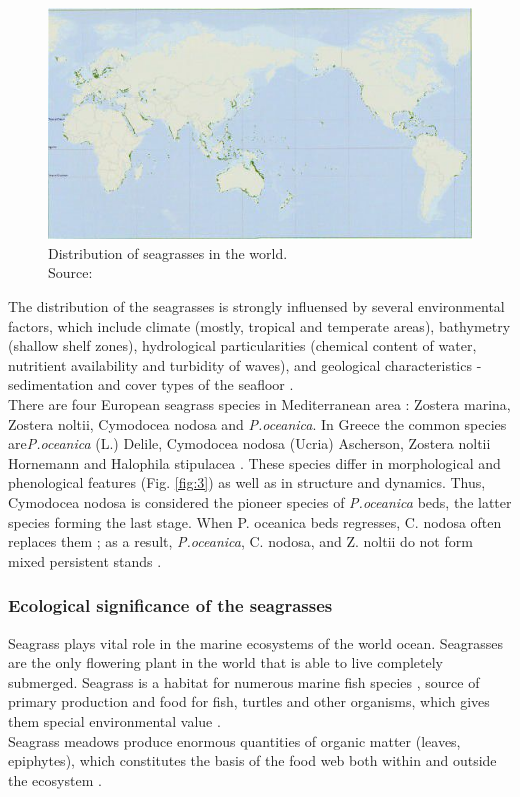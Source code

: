 \documentclass[10pt, a4paper]{article}
\begin{document}
\begin{figure}
	\centering
	\includegraphics[scale=0.25]{Fig-1-2.jpg}
	\caption{Distribution of seagrasses in the world.\\ Source:\cite{Green03}\label{Green03} 
	\label{fig:2}} 
\end{figure}

The distribution of the seagrasses is strongly influensed by several environmental factors, which
include climate (mostly, tropical and temperate areas), bathymetry (shallow shelf zones), hydrological
particularities (chemical content of water, nutritient availability and turbidity of waves), and geological 
characteristics - sedimentation and cover types of the seafloor \cite{McKenzie06}\label{McKenzie06}.\\
There are four European seagrass species in Mediterranean area \cite{Borum04}\label{Borum04}: Zostera marina,
Zostera noltii, Cymodocea nodosa and \textit{P.oceanica}. In Greece the common species are\textit{P.oceanica}
(L.) Delile, Cymodocea nodosa (Ucria) Ascherson, Zostera noltii Hornemann and Halophila
stipulacea \cite{Amoutzopoulou-Schina05}\label{Amoutzopoulou-Schina05}. 
These species differ in morphological and
phenological features (Fig. \ref{fig:3}) as well as in structure and dynamics. Thus, Cymodocea nodosa is
considered the pioneer species of \textit{P.oceanica} beds, the latter species forming the last stage. When P.
oceanica beds regresses, C. nodosa often replaces them \cite{DenHartog77}\label{DenHartog77}; as a result, \textit{P.oceanica},
C. nodosa, and Z. noltii do not form mixed persistent stands \cite{Buia91}\label{Buia91}.

\subsubsection{Ecological significance of the seagrasses}
Seagrass plays vital role in the marine ecosystems of the world ocean. Seagrasses are the only
flowering plant in the world that is able to live completely submerged. Seagrass is a habitat for
numerous marine fish species \cite{Nagelkerken00}\label{Nagelkerken00}, source of primary production and food for
fish, turtles and other organisms, which gives them special environmental value \cite{Noralez10}\label{Noralez10}.\\
Seagrass meadows produce enormous quantities of organic matter (leaves, epiphytes), which
constitutes the basis of the food web both within and outside the ecosystem \cite{Gobert06}\label{Gobert06}.
\end{document}
